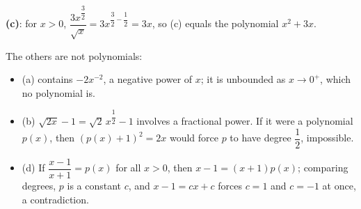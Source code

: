 \textbf{(c)}: for $x>0$, $\dfrac{3x^{\dfrac{3}{2}}}{\sqrt{x}}=3x^{\dfrac{3}{2}-\dfrac{1}{2}}=3x$, so (c) equals the polynomial $x^2+3x$.

The others are not polynomials:
\begin{itemize}
\item (a) contains $-2x^{-2}$, a negative power of $x$; it is unbounded as $x\to0^+$, which no polynomial is.
\item (b) $\sqrt{2x}-1=\sqrt2\,x^{\dfrac{1}{2}}-1$ involves a fractional power. If it were a polynomial $p(x)$, then $(p(x)+1)^2=2x$ would force $p$ to have degree $\dfrac{1}{2}$, impossible.
\item (d) If $\dfrac{x-1}{x+1}=p(x)$ for all $x>0$, then $x-1=(x+1)p(x)$; comparing degrees, $p$ is a constant $c$, and $x-1=cx+c$ forces $c=1$ and $c=-1$ at once, a contradiction.
\end{itemize}
